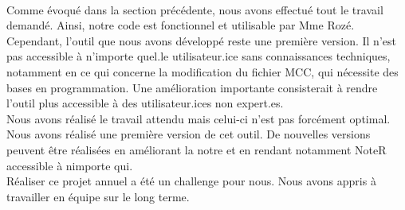 \\
Comme évoqué dans la section précédente, nous avons effectué tout le travail demandé.
Ainsi, notre code est fonctionnel et utilisable par Mme Rozé. 
\\
Cependant, l'outil que nous avons développé reste une première version.
Il n’est pas accessible à n’importe quel.le utilisateur.ice sans connaissances techniques, notamment en ce qui concerne la modification du fichier MCC, qui nécessite des bases en programmation. 
Une amélioration importante consisterait à rendre l’outil plus accessible à des utilisateur.ices non expert.es.
\\
Nous avons réalisé le travail attendu mais celui-ci n'est pas forcément optimal. Nous avons 
réalisé une première version de cet outil. De nouvelles versions peuvent être réalisées
 en améliorant la notre et en rendant notamment NoteR accessible à nimporte qui.
\\
Réaliser ce projet annuel a été un challenge pour nous. Nous avons appris à travailler en équipe sur le long terme.
